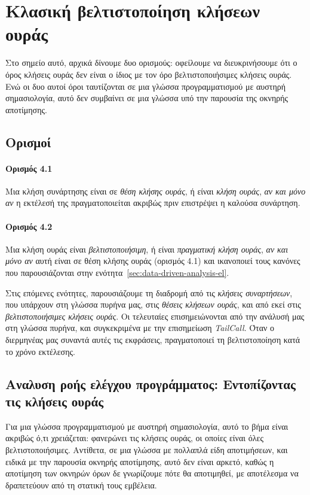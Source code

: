 \documentclass[diploma]{softlab-thesis}
\begin{document}

\section{Κλασική βελτιστοποίηση κλήσεων ουράς}

Στο σημείο αυτό, αρχικά δίνουμε δυο ορισμούς: οφείλουμε να διευκρινήσουμε ότι ο όρος κλήσεις ουράς δεν είναι ο ίδιος με 
τον όρο βελτιστοποιήσιμες κλήσεις ουράς. Ενώ οι δυο αυτοί όροι ταυτίζονται σε μια γλώσσα προγραμματισμού με αυστηρή σημασιολογία,
αυτό δεν συμβαίνει σε μια γλώσσα υπό την παρουσία της οκνηρής αποτίμησης.

\subsection{Ορισμοί}

\paragraph{Ορισμός 4.1}
Μια κλήση συνάρτησης είναι σε \textit{θέση κλήσης ουράς}, ή είναι \textit{κλήση ουράς}, \textit{αν και μόνο αν} η εκτέλεσή της πραγματοποιείται ακριβώς πριν επιστρέψει 
η καλούσα συνάρτηση.

\paragraph{Ορισμός 4.2}
Μια κλήση ουράς είναι \textit{βελτιστοποιήσιμη}, ή είναι \textit{πραγματική κλήση ουράς}, \textit{αν και μόνο αν} αυτή είναι σε θέση κλήσης ουράς (ορισμός 4.1) και ικανοποιεί τους κανόνες που παρουσιάζονται 
στην ενότητα~\ref{sec:data-driven-analysis-el}.

Στις επόμενες ενότητες, παρουσιάζουμε τη διαδρομή από τις \textit{κλήσεις συναρτήσεων}, που υπάρχουν στη γλώσσα πυρήνα μας, στις \textit{θέσεις κλήσεων ουράς}, 
και από εκεί στις \textit{βελτιστοποιήσιμες κλήσεις ουράς}. Οι τελευταίες επισημειώνονται από την ανάλυσή μας στη γλώσσα πυρήνα, 
και συγκεκριμένα με την επισημείωση \textit{TailCall}. Όταν ο διερμηνέας μας συναντά αυτές τις εκφράσεις, πραγματοποιεί τη βελτιστοποίηση κατά το χρόνο εκτέλεσης.

\subsection{Αναλυση ροής ελέγχου προγράμματος: Εντοπίζοντας τις κλήσεις ουράς}
\label{sec:control-flow-el}

Για μια γλώσσα προγραμματισμού με αυστηρή σημασιολογία, αυτό το βήμα είναι ακριβώς ό,τι χρειάζεται: φανερώνει τις κλήσεις ουράς, οι οποίες είναι όλες βελτιστοποιήσιμες. 
Αντίθετα, σε μια γλώσσα με πολλαπλά είδη αποτιμήσεων, και ειδικά με την παρουσία οκνηρής αποτίμησης, αυτό δεν είναι αρκετό, καθώς η αποτίμηση των οκνηρών όρων δε γνωρίζουμε πότε θα 
αποτιμηθεί, με αποτέλεσμα να δραπετεύουν από τη στατική τους εμβέλεια.  
\end{document}
